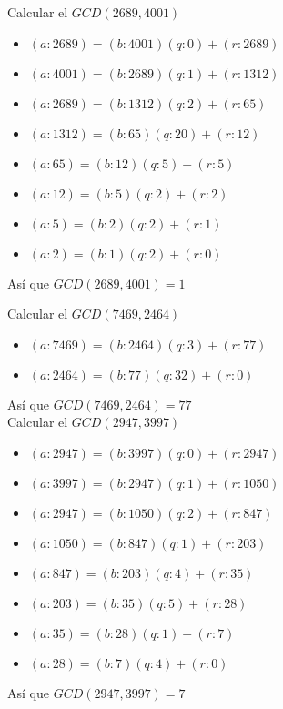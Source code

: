 \documentclass[12pt, fleqn]{article}                             %
\begin{document}
            Calcular el $GCD(2689, 4001)$
            \begin{itemize}
                \item $(a:2689) = (b:4001)(q:0) + (r:2689)$ 
                \item $(a:4001) = (b:2689)(q:1) + (r:1312)$ 
                \item $(a:2689) = (b:1312)(q:2) + (r:65)$   
                \item $(a:1312) = (b:65)(q:20) + (r:12)$  
                \item $(a:65) = (b:12)(q:5) + (r:5)$ 
                \item $(a:12) = (b:5)(q:2) + (r:2)$
                \item $(a:5) = (b:2)(q:2) + (r:1)$    
                \item $(a:2) = (b:1)(q:2) + (r:0)$   
            
            \end{itemize}                    
            Así que $GCD(2689, 4001) = 1$\\

            \clearpage



            Calcular el $GCD(7469, 2464)$
            \begin{itemize}
                \item $(a:7469) = (b:2464)(q:3) + (r:77)$                       
                \item $(a:2464) = (b:77)(q:32) + (r:0)$
            \end{itemize}
            Así que $GCD(7469, 2464) = 77$\\


            Calcular el $GCD(2947, 3997)$
            \begin{itemize}
                \item $(a:2947) = (b:3997)(q:0) + (r:2947)$
                \item $(a:3997) = (b:2947)(q:1) + (r:1050)$
                \item $(a:2947) = (b:1050)(q:2) + (r:847)$
                \item $(a:1050) = (b:847)(q:1) + (r:203)$
                \item $(a:847) = (b:203)(q:4) + (r:35)$
                \item $(a:203) = (b:35)(q:5) + (r:28)$
                \item $(a:35) = (b:28)(q:1) + (r:7)$
                \item $(a:28) = (b:7)(q:4) + (r:0)$
            \end{itemize}                    
            Así que $GCD(2947, 3997) = 7$\\
\end{document}
